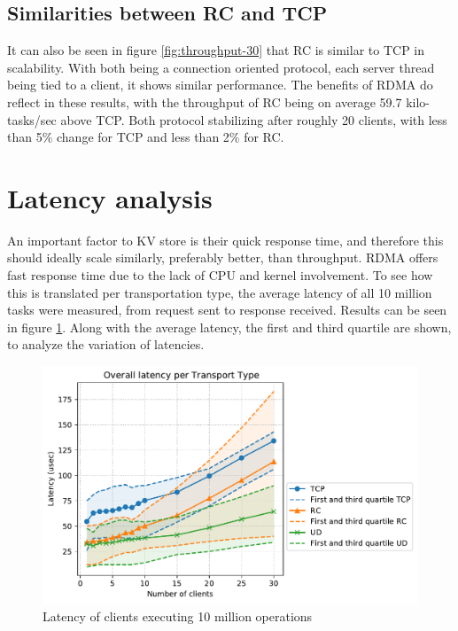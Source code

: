 \subsection{Similarities between RC and TCP}
It can also be seen in figure \ref{fig:throughput-30} that RC is similar to TCP in scalability.
With both being a connection oriented protocol, each server thread being tied to a client, it shows similar performance.
The benefits of RDMA do reflect in these results, with the throughput of RC being on average 59.7 kilo-tasks/sec above TCP.
Both protocol stabilizing after roughly 20 clients, with less than 5\% change for TCP and less than 2\% for RC.


\section{Latency analysis}\label{sec:latency:analysis}
An important factor to KV store is their quick response time, and therefore this should ideally scale similarly, preferably better, than throughput.
RDMA offers fast response time due to the lack of CPU and kernel involvement.
To see how this is translated per transportation type, the average latency of all 10 million tasks were measured, from request sent to response received.
Results can be seen in figure \ref{fig:latency-30}.
Along with the average latency, the first and third quartile are shown, to analyze the variation of latencies.

\begin{figure}
    \centering
    \includegraphics[width=\columnwidth]{figures/PDF/Latency_avg_30}
    \caption{Latency of clients executing 10 million operations}
    \label{fig:latency-30}
\end{figure}

